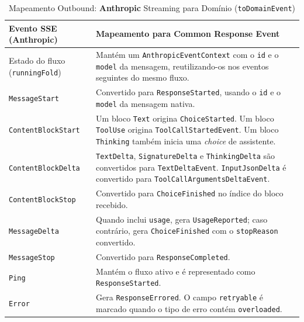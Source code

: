     \begin{table}[H]
        \centering
        \footnotesize
        \renewcommand{\arraystretch}{1.25}
        \begin{tabularx}{\textwidth}{|>{\raggedright\arraybackslash}p{4cm}|Y|}
            \hline
            \textbf{Evento SSE (Anthropic)} & \textbf{Mapeamento para Common Response Event} \\
            \hline
            Estado do fluxo (\texttt{runningFold}) & Mantém um \texttt{AnthropicEventContext} com o \texttt{id} e o \texttt{model} da mensagem, reutilizando-os nos eventos seguintes do mesmo fluxo. \\
            \hline
            \texttt{MessageStart} & Convertido para \texttt{ResponseStarted}, usando o \texttt{id} e o \texttt{model} da mensagem nativa. \\
            \hline
            \texttt{ContentBlockStart} & Um bloco \texttt{Text} origina \texttt{ChoiceStarted}. Um bloco \texttt{ToolUse} origina \texttt{ToolCallStartedEvent}. Um bloco \texttt{Thinking} também inicia uma \textit{choice} de assistente. \\
            \hline
            \texttt{ContentBlockDelta} & \texttt{TextDelta}, \texttt{SignatureDelta} e \texttt{ThinkingDelta} são convertidos para \texttt{TextDeltaEvent}. \texttt{InputJsonDelta} é convertido para \texttt{ToolCallArgumentsDeltaEvent}. \\
            \hline
            \texttt{ContentBlockStop} & Convertido para \texttt{ChoiceFinished} no índice do bloco recebido. \\
            \hline
            \texttt{MessageDelta} & Quando inclui \texttt{usage}, gera \texttt{UsageReported}; caso contrário, gera \texttt{ChoiceFinished} com o \texttt{stopReason} convertido. \\
            \hline
            \texttt{MessageStop} & Convertido para \texttt{ResponseCompleted}. \\
            \hline
            \texttt{Ping} & Mantém o fluxo ativo e é representado como \texttt{ResponseStarted}. \\
            \hline
            \texttt{Error} & Gera \texttt{ResponseErrored}. O campo \texttt{retryable} é marcado quando o tipo de erro contém \texttt{overloaded}. \\
            \hline
        \end{tabularx}
        \caption{Mapeamento Outbound: \textbf{Anthropic} Streaming para Domínio (\texttt{toDomainEvent})}
    \end{table}

